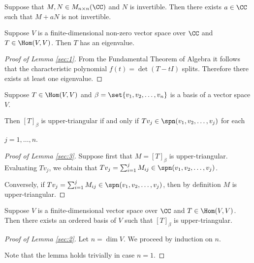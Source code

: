 \documentclass[11pt]{scrartcl}
\begin{document}
\begin{linenumbers}
  \begin{claim*}
    Suppose that $M, N \in M_{n\times n}(\CC)$ and $N$ is
    invertible. Then there exists $a\in\CC$ such that $M+aN$ is not
    invertible.
  \end{claim*}
  \begin{lemma}
    \label{sec:1}
    Suppose $V$ is a finite-dimensional non-zero vector space over $\CC$ and
    $T\in \Hom(V,V)$. Then $T$ has an eigenvalue.
  \end{lemma}
  \begin{proof}[Proof of Lemma \ref{sec:1}]
    From the Fundamental Theorem of Algebra it follows that the
    characteristic polynomial $f(t) = \det(T-tI)$ splits. Therefore
    there exists at least one eigenvalue.
  \end{proof}
  \begin{lemma}
    \label{sec:3}
    Suppose $T\in\Hom(V,V)$ and $\beta=\set{v_1, v_2, \dots, v_n}$ is
    a basis of a vector space $V$.

    Then $[T]_{\beta}$ is upper-triangular if and only if
    $Tv_j\in\spn(v_1, v_2,\dots, v_j)$ for each

    $j = 1, \dots ,n$.
  \end{lemma}
  \begin{proof}[Proof of Lemma \ref{sec:3}]

    Suppose first that $M = [T]_{\beta}$ is upper-triangular. Evaluating
    $Tv_{j}$, we obtain that $Tv_{j} = \sum_{i=1}^{j}M_{ij} \in \spn(v_1, v_2,\dots, v_j)$.

    Conversely, if
    $Tv_{j} = \sum_{i=1}^{j}M_{ij} \in \spn(v_1, v_2,\dots, v_j)$,
    then by definition $M$ is upper-triangular.
  \end{proof}

  \begin{lemma}
    \label{sec:2}
    Suppose $V$ is a finite-dimensional vector space over $\CC$ and
    $T\in \Hom(V,V)$. Then there exists an ordered basis of $V$ such
    that $[T]_{\beta}$ is upper-triangular.
  \end{lemma}
  \begin{proof}[Proof of Lemma \ref{sec:2}]
    Let $n=\dim V$. We proceed by induction on $n$.

    Note that the lemma holds trivially in case $n=1$.


\end{proof}
\end{linenumbers}
\end{document}
